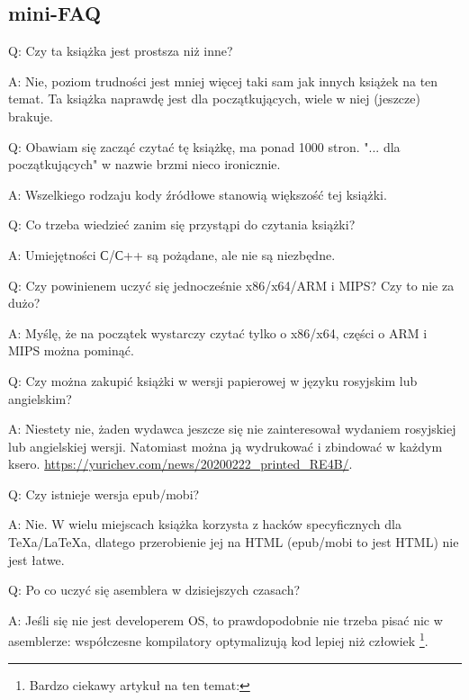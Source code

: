 \subsection*{mini-FAQ}

\par Q: Czy ta książka jest prostsza niż inne?
\par A: Nie, poziom trudności jest mniej więcej taki sam jak innych książek na ten temat.
Ta książka naprawdę jest dla początkujących, wiele w niej (jeszcze) brakuje.

\par Q: Obawiam się zacząć czytać tę książkę, ma ponad 1000 stron. 
"... dla początkujących" w nazwie brzmi nieco ironicznie.
\par A: Wszelkiego rodzaju kody źródłowe stanowią większość tej książki.

\par Q: Co trzeba wiedzieć zanim się przystąpi do czytania książki?
\par A: Umiejętności С/С++ są pożądane, ale nie są niezbędne.

\par Q: Czy powinienem uczyć się jednocześnie x86/x64/ARM i MIPS? Czy to nie za dużo?
\par A: Myślę, że na początek wystarczy czytać tylko o x86/x64, części o ARM i MIPS można pominąć.

\par Q: Czy można zakupić książki w wersji papierowej w języku rosyjskim lub angielskim?
\par A: Niestety nie, żaden wydawca jeszcze się nie zainteresował wydaniem rosyjskiej lub angielskiej wersji. Natomiast można ją wydrukować i zbindować w każdym ksero.
\url{https://yurichev.com/news/20200222_printed_RE4B/}.

\par Q: Czy istnieje wersja epub/mobi?
\par A: Nie. W wielu miejscach książka korzysta z hacków specyficznych dla TeXa/LaTeXa, dlatego przerobienie jej na HTML
(epub/mobi to jest HTML) nie jest łatwe.

\par Q: Po co uczyć się asemblera w dzisiejszych czasach?
\par A: Jeśli się nie jest developerem \ac{OS}, to prawdopodobnie nie trzeba pisać nic w asemblerze: współczesne kompilatory optymalizują kod lepiej niż człowiek \footnote{Bardzo ciekawy artykuł na ten temat: \InSqBrackets{\AgnerFog}}.


